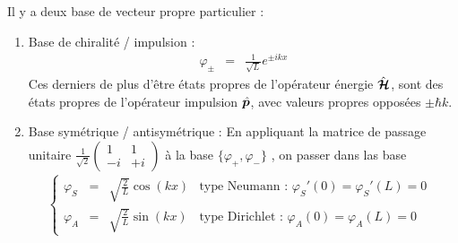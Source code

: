 \medskip
Il y a deux base de vecteur propre particulier : 
\begin{enumerate}[label=\roman*)]
	\item Base de chiralité / impulsion :
	\begin{eqnarray}
		\varphi_\pm  & = & \displaystyle \frac{1}{\sqrt{L}} e^{\pm ikx} 
	\end{eqnarray}
	Ces derniers de plus d'être états propres de l’opérateur énergie $\hat{\bm{\mathcal{H}}}$, sont des états propres de l’opérateur impulsion $\hat{\bm{p}}$, avec valeurs propres opposées $\pm \hbar k$.
	\item Base symétrique / antisymétrique : En appliquant la matrice de passage unitaire  $\frac{1}{\sqrt{2}}\left (\begin{matrix}1 & 1 \\ -i & + i\end{matrix}\right)$ à la base $\{ \varphi_+ , \varphi_- \}$ , on passer dans las base    
	\begin{eqnarray}
		\left \{ \begin{array}{rcllll} \varphi_S  & = & \displaystyle \sqrt{\frac{2}{L}} \cos (kx)  & \mbox{type Neumann  : $\varphi_S'(0) = \varphi_S'(L) = 0 $ } \\ \varphi_A   & = & \displaystyle \sqrt{\frac{2}{L}} \sin (kx)  & \mbox{type Dirichlet : $\varphi_A(0) = \varphi_A(L) = 0 $}\end{array} \right.
	\end{eqnarray}
\end{enumerate}


